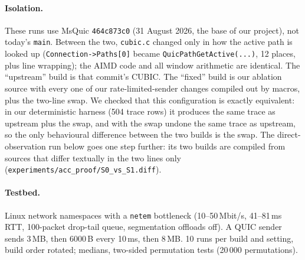 \documentclass[11pt,a4paper]{article}
\begin{document}
\paragraph{Isolation.} These runs use MsQuic \texttt{464c873c0} (31 August
2026, the base of our project), not today's \texttt{main}. Between the two,
\texttt{cubic.c} changed only in how the active path is looked up
(\texttt{Connection->Paths[0]} became \texttt{QuicPathGetActive(...)}, 12
places, plus line wrapping); the AIMD code and all window arithmetic are
identical. The
``upstream'' build is that commit's CUBIC. The ``fixed'' build is our ablation
source with every one of our rate-limited-sender changes compiled out by
macros, plus the two-line swap. We checked that this configuration is exactly
equivalent: in our deterministic harness (504 trace rows) it produces the same
trace as upstream plus the swap, and with the swap undone the same trace as
upstream, so the only behavioural difference between the two builds is the
swap. The direct-observation run below goes
one step further: its two builds are compiled from sources that differ
textually in the two lines only (\texttt{experiments/acc\_proof/S0\_vs\_S1.diff}).

\paragraph{Testbed.} Linux network namespaces with a \texttt{netem}
bottleneck (10--50\,Mbit/s, 41--81\,ms RTT, 100-packet drop-tail queue,
segmentation offloads off). A QUIC sender sends 3\,MB, then 6000\,B every
10\,ms, then 8\,MB. 10 runs per build and setting, build order rotated; medians,
two-sided permutation tests (20\,000 permutations).
\end{document}
